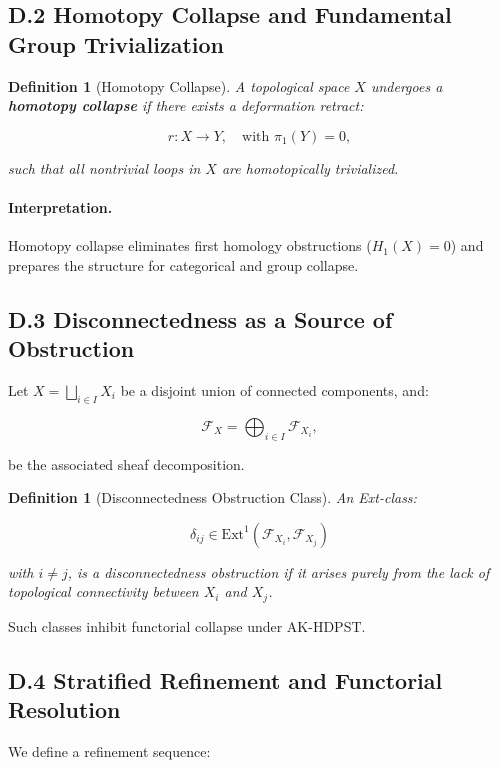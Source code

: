 \documentclass[11pt]{article}
\newtheorem{definition}[theorem]{Definition}
\begin{document}
\subsection*{D.2 Homotopy Collapse and Fundamental Group Trivialization}

\begin{definition}[Homotopy Collapse]
A topological space \( X \) undergoes a \textbf{homotopy collapse} if there exists a deformation retract:

\[
r: X \to Y, \quad \text{with } \pi_1(Y) = 0,
\]

such that all nontrivial loops in \( X \) are homotopically trivialized.
\end{definition}

\paragraph{Interpretation.}
Homotopy collapse eliminates first homology obstructions (\( H_1(X) = 0 \)) and prepares the structure for categorical and group collapse.

\subsection*{D.3 Disconnectedness as a Source of Obstruction}

Let \( X = \bigsqcup_{i \in I} X_i \) be a disjoint union of connected components, and:

\[
\mathcal{F}_X = \bigoplus_{i \in I} \mathcal{F}_{X_i},
\]

be the associated sheaf decomposition.

\begin{definition}[Disconnectedness Obstruction Class]
An Ext-class:

\[
\delta_{ij} \in \mathrm{Ext}^1(\mathcal{F}_{X_i}, \mathcal{F}_{X_j})
\]

with \( i \neq j \), is a \emph{disconnectedness obstruction} if it arises purely from the lack of topological connectivity between \( X_i \) and \( X_j \).
\end{definition}

Such classes inhibit functorial collapse under AK-HDPST.

\subsection*{D.4 Stratified Refinement and Functorial Resolution}

We define a refinement sequence:
\end{document}
